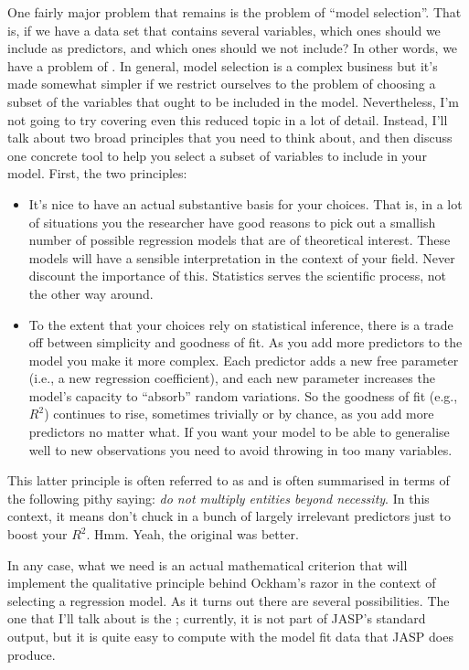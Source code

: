 One fairly major problem that remains is the problem of ``model selection''. That is, if we have a data set that contains several variables, which ones should we include as predictors, and which ones should we not include? In other words, we have a problem of . In general, model selection is a complex business but it's made somewhat simpler if we restrict ourselves to the problem of choosing a subset of the variables that ought to be included in the model. Nevertheless, I'm not going to try covering even this reduced topic in a lot of detail. Instead, I'll talk about two broad principles that you need to think about, and then discuss one concrete tool to help you select a subset of variables to include in your model. First, the two principles:
\begin{itemize}
\item It's nice to have an actual substantive basis for your choices. That is, in a lot of situations you the researcher have good reasons to pick out a smallish number of possible regression models that are of theoretical interest. These models will have a sensible interpretation in the context of your field. Never discount the importance of this. Statistics serves the scientific process, not the other way around. 
\item To the extent that your choices rely on statistical inference, there is a trade off between simplicity and goodness of fit. As you add more predictors to the model you make it more complex. Each predictor adds a new free parameter (i.e., a new regression coefficient), and each new parameter increases the model's capacity to ``absorb'' random variations. So the goodness of fit (e.g., $R^2$) continues to rise, sometimes trivially or by chance, as you add more predictors no matter what. If you want your model to be able to generalise well to new observations you need to avoid throwing in too many variables. 
\end{itemize}
This latter principle is often referred to as  and is often summarised in terms of the following pithy saying: {\it do not multiply entities beyond necessity}. In this context, it means don't chuck in a bunch of largely irrelevant predictors just to boost your $R^2$. Hmm. Yeah, the original was better. 

In any case, what we need is an actual mathematical criterion that will implement the qualitative principle behind Ockham's razor in the context of selecting a regression model. As it turns out there are several possibilities. The one that I'll talk about is the  \parencite[AIC; ][]{Akaike1974}; currently, it is not part of JASP's standard output, but it is quite easy to compute with the model fit data that JASP does produce. 

